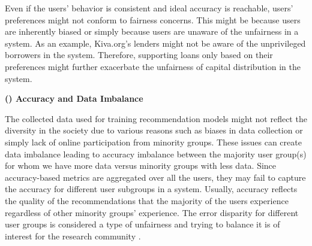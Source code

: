 Even if the users' behavior is consistent and ideal accuracy is reachable, users' preferences might not conform to fairness concerns. This might be because users are inherently biased or simply because users are unaware of the unfairness in a system. As an example, Kiva.org's lenders might not be aware of the unprivileged borrowers in the system. Therefore, supporting loans only based on their preferences might further exacerbate the unfairness of capital distribution in the system.






\vspace{0.25cm}
\noindent \textbf{() Accuracy and Data Imbalance}
\vspace{0.25cm}

The collected data used for training recommendation models might not reflect the diversity in the society due to various reasons such as biases in data collection or simply lack of online participation from minority groups. These issues can create data imbalance leading to accuracy imbalance between the majority user group(s) for whom we have more data versus minority groups with less data. Since accuracy-based metrics are aggregated over all the users, they may fail to capture the accuracy for different user subgroups in a system. Usually, accuracy reflects the quality of the recommendations that the majority of the users experience regardless of other minority groups' experience. The error disparity for different user groups is considered a type of unfairness and trying to balance it is of interest for the research community \cite{ekstrand2018all,yao2017beyond}.

